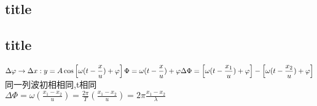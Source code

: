 \documentclass[UTF8,a4paper,12pt,scheme=chinese]{ctexart}
\begin{document}
\begin{Large}
		\section{title}
		\subsection{title}
		$\displaystyle\\
		\Delta \varphi \rightarrow \Delta x:\\
		y=A\cos \left[\omega(t-\frac{x}{u})+\varphi\right]\\
		\Phi = \omega(t-\frac{x}{u})+\varphi\\
		\Delta \Phi = \left[\omega(t-\frac{x_1}{u})+\varphi\right] - \left[\omega(t-\frac{x_2}{u})+\varphi\right]
		$\\
		同一列波初相相同,t相同\\
		$\displaystyle
		\Delta \Phi = \omega\left(\frac{x_1-x_2}{u}\right) = \frac{2\pi}{T}\left(\frac{x_1-x_2}{u}\right) = 2\pi\frac{x_1-x_2}{\lambda}
		$

	\end{Large}
\end{document}

